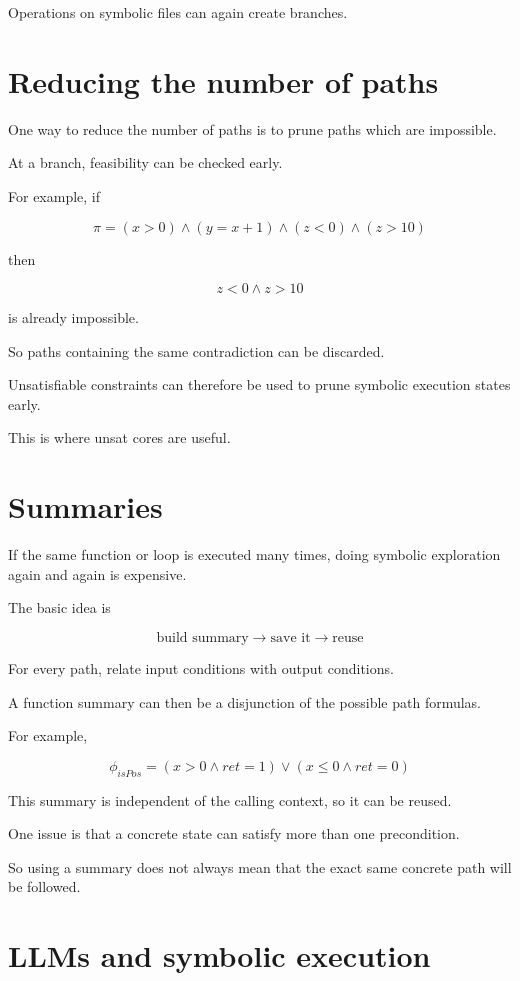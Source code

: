 \documentclass[11pt]{book}
\begin{document}
Operations on symbolic files can again create branches.

\section{Reducing the number of paths}

One way to reduce the number of paths is to prune
paths which are impossible.

At a branch, feasibility can be checked early.

For example, if

\[
\pi=(x>0)\land(y=x+1)\land(z<0)\land(z>10)
\]

then

\[
z<0\land z>10
\]

is already impossible.

So paths containing the same contradiction can be discarded.

\begin{ppnote}
Unsatisfiable constraints can therefore be used to prune
symbolic execution states early.
\end{ppnote}

This is where unsat cores are useful.

\section{Summaries}

If the same function or loop is executed many times,
doing symbolic exploration again and again is expensive.

The basic idea is

\[
\text{build summary}
\rightarrow
\text{save it}
\rightarrow
\text{reuse}
\]

For every path, relate input conditions with output
conditions.

A function summary can then be a disjunction of the
possible path formulas.

For example,

\[
\phi_{isPos}
=
(x>0\land ret=1)
\lor
(x\leq0\land ret=0)
\]

This summary is independent of the calling context,
so it can be reused.

One issue is that a concrete state can satisfy more than
one precondition.

So using a summary does not always mean that the exact
same concrete path will be followed.

\section{LLMs and symbolic execution}
\end{document}
